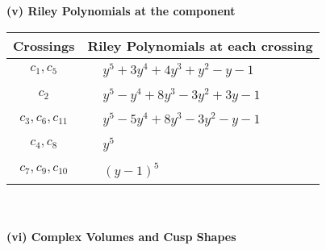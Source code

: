 \documentclass[1p]{elsarticle_modified}
\theoremstyle{definition}
\begin{document}
\newpage\renewcommand{\arraystretch}{1}
\flushleft \textbf{(v) Riley Polynomials at the component}\newline \\
\begin{tabular}{m{50pt}|m{274pt}}
Crossings & \hspace{64pt}Riley Polynomials at each crossing \\
\hline $$\begin{aligned}c_{1},c_{5}\end{aligned}$$&$\begin{aligned}
&y^5+3 y^4+4 y^3+y^2- y-1
\end{aligned}$\\
\hline $$\begin{aligned}c_{2}\end{aligned}$$&$\begin{aligned}
&y^5- y^4+8 y^3-3 y^2+3 y-1
\end{aligned}$\\
\hline $$\begin{aligned}c_{3},c_{6},c_{11}\end{aligned}$$&$\begin{aligned}
&y^5-5 y^4+8 y^3-3 y^2- y-1
\end{aligned}$\\
\hline $$\begin{aligned}c_{4},c_{8}\end{aligned}$$&$\begin{aligned}
&y^5
\end{aligned}$\\
\hline $$\begin{aligned}c_{7},c_{9},c_{10}\end{aligned}$$&$\begin{aligned}
&(y-1)^5
\end{aligned}$\\
\hline
\end{tabular}\\~\\
\newpage\flushleft \textbf{(vi) Complex Volumes and Cusp Shapes}
\end{document}
